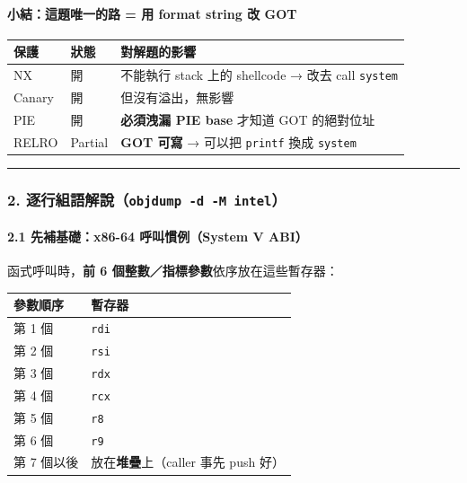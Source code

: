 \documentclass[10pt,a4paper]{article}
\newcounter{none}
\begin{document}
\paragraph{小結：這題唯一的路 = 用 format string 改
GOT}\label{ux5c0fux7d50ux9019ux984cux552fux4e00ux7684ux8def-ux7528-format-string-ux6539-got}

{\def\LTcaptype{none} %
\begin{longtable}[]{@{}lll@{}}
\toprule\noalign{}
保護 & 狀態 & 對解題的影響 \\
\midrule\noalign{}
\endhead
\bottomrule\noalign{}
\endlastfoot
NX & 開 & 不能執行 stack 上的 shellcode → 改去 call \texttt{system} \\
Canary & 開 & 但沒有溢出，無影響 \\
PIE & 開 & \textbf{必須洩漏 PIE base} 才知道 GOT 的絕對位址 \\
RELRO & Partial & \textbf{GOT 可寫} → 可以把 \texttt{printf} 換成
\texttt{system} \\
\end{longtable}
}

\begin{center}\rule{0.5\linewidth}{0.5pt}\end{center}

\subsubsection{\texorpdfstring{2.
逐行組語解說（\texttt{objdump\ \allowbreak{}-\allowbreak{}d\ \allowbreak{}-\allowbreak{}M\ \allowbreak{}intel}）}{2. 逐行組語解說（objdump -d -M intel）}}\label{ux9010ux884cux7d44ux8a9eux89e3ux8aaaobjdump--d--m-intel}

\paragraph{2.1 先補基礎：x86-64 呼叫慣例（System V
ABI）}\label{ux5148ux88dcux57faux790ex86-64-ux547cux53ebux6163ux4f8bsystem-v-abi}

函式呼叫時，\textbf{前 6 個整數／指標參數}依序放在這些暫存器：

{\def\LTcaptype{none} %
\begin{longtable}[]{@{}ll@{}}
\toprule\noalign{}
參數順序 & 暫存器 \\
\midrule\noalign{}
\endhead
\bottomrule\noalign{}
\endlastfoot
第 1 個 & \texttt{rdi} \\
第 2 個 & \texttt{rsi} \\
第 3 個 & \texttt{rdx} \\
第 4 個 & \texttt{rcx} \\
第 5 個 & \texttt{r8} \\
第 6 個 & \texttt{r9} \\
第 7 個以後 & 放在\textbf{堆疊}上（caller 事先 push 好） \\
\end{longtable}
}
\end{document}
